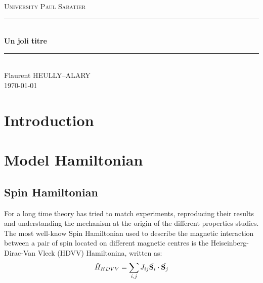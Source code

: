 \documentclass{article}
\newcommand{\noun}[1]{\textsc{#1}}
\begin{document}

\begin{titlepage}
\newcommand{\HRule}{\rule{\linewidth}{0.5mm}}
\center
\textsc{\LARGE
University \noun{Paul Sabatier}
} \\[1cm]
\HRule\\[0.4cm]
{ \huge \bfseries Un joli titre \\[0.15cm] }
\HRule\\[1.5cm]
Flaurent HEULLY--ALARY
\\[1cm]
\today \\ [1cm]
\end{titlepage}
\begin{center}
\thispagestyle{plain}
\par\end{center}
\large
\tableofcontents
\newpage
\section{Introduction}

\section{Model Hamiltonian}

\subsection{Spin Hamiltonian}
For a long time theory has tried to match experiments, reproducing their results and understanding the mechanism at the origin of the different properties studies.
The most well-know Spin Hamiltonian used to describe the magnetic interaction between a pair of spin located on different magnetic centres is the Heiseinberg-Dirac-Van Vleck (HDVV) Hamiltonina, written as:
\begin{equation}\label{Hheis}
    \hat{H}_{HDVV}=\sum_{i,j} J_{ij} \hat{\vb S_i} \cdot \hat{\vb S_j}
\end{equation}
\end{document}
